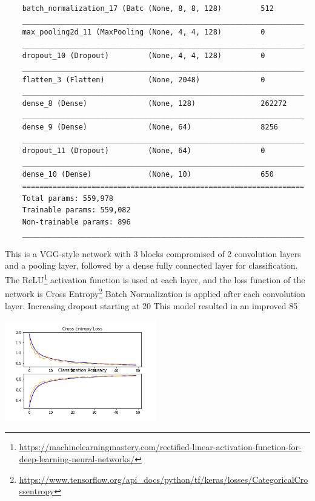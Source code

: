 \begin{center}
\begin{verbatim}
    batch_normalization_17 (Batc (None, 8, 8, 128)         512       
    _________________________________________________________________
    max_pooling2d_11 (MaxPooling (None, 4, 4, 128)         0         
    _________________________________________________________________
    dropout_10 (Dropout)         (None, 4, 4, 128)         0         
    _________________________________________________________________
    flatten_3 (Flatten)          (None, 2048)              0         
    _________________________________________________________________
    dense_8 (Dense)              (None, 128)               262272    
    _________________________________________________________________
    dense_9 (Dense)              (None, 64)                8256      
    _________________________________________________________________
    dropout_11 (Dropout)         (None, 64)                0         
    _________________________________________________________________
    dense_10 (Dense)             (None, 10)                650       
    =================================================================
    Total params: 559,978
    Trainable params: 559,082
    Non-trainable params: 896
    _________________________________________________________________
    \end{verbatim}
\end{center}
This is a VGG-style network with 3 blocks compromised of 2 convolution layers and a pooling layer, followed by a dense fully connected layer for classification.
The ReLU\footnote{\href{https://machinelearningmastery.com/rectified-linear-activation-function-for-deep-learning-neural-networks/}{https://machinelearningmastery.com/rectified-linear-activation-function-for-deep-learning-neural-networks/}} activation function is used at each layer, and the loss function of the network is Cross Entropy\footnote{\href{https://www.tensorflow.org/api\_docs/python/tf/keras/losses/CategoricalCrossentropy}{https://www.tensorflow.org/api\_docs/python/tf/keras/losses/CategoricalCrossentropy}}
Batch Normalization is applied after each convolution layer.
Increasing dropout starting at 20%
This model resulted in an improved 85%
\begin{center}
    \captionsetup{type=figure}
    \includegraphics[width=250px]{sections/exp-2/images/improved-plot.png}
\end{center}
